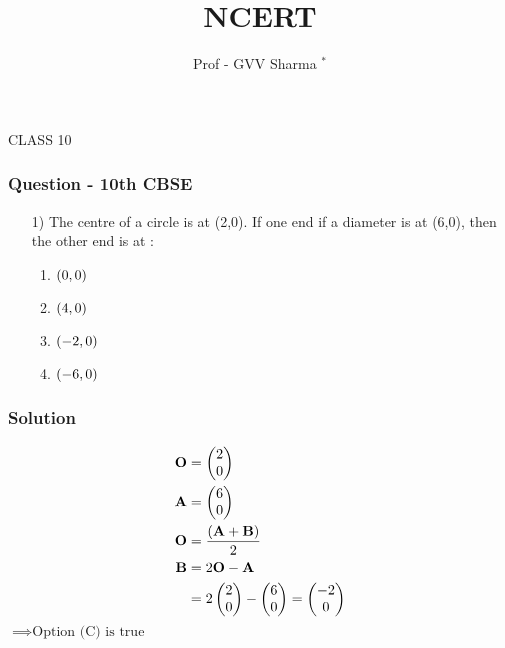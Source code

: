 \documentclass{beamer}
\begin{document}
\title{NCERT}
\author{ Prof - GVV Sharma $^{*}$}
\date{}
\frame{\titlepage}




\begin{frame}[standout]
    CLASS 10
\end{frame}


\begin{frame}
\frametitle{Question - 10th CBSE}
\begin{enumerate}
    \item [1)]
The centre of a circle is at (2,0). If one end if a diameter is at (6,0), then the other end is at :
\begin{enumerate}
\item $\left(0,0\right)$
\item $\left(4,0\right)$
\item $\left(-2,0\right)$
\item $\left(-6,0\right)$
\end{enumerate}
\end{enumerate}
\end{frame}




\begin{frame}
\frametitle{Solution}
\begin{align}
\textbf{O} &=
    \begin{pmatrix}
2 \\
0 
\end{pmatrix}\\
\textbf{A} &=
    \begin{pmatrix}
6 \\
0 
\end{pmatrix}
\\
\textbf{O} &= \dfrac{\left(\textbf{A} + \textbf{B}\right)}{2}\\
\textbf{B} &= 2\textbf{O} - \textbf{A}\\
    &=  2\begin{pmatrix}
2 \\
0 
\end{pmatrix} -  \begin{pmatrix}
6 \\
0 
\end{pmatrix}
=\begin{pmatrix}
   -2\\
   0
\end{pmatrix}
\end{align}
$\implies \text{Option (C) is true}$
\end{frame}
\end{document}

